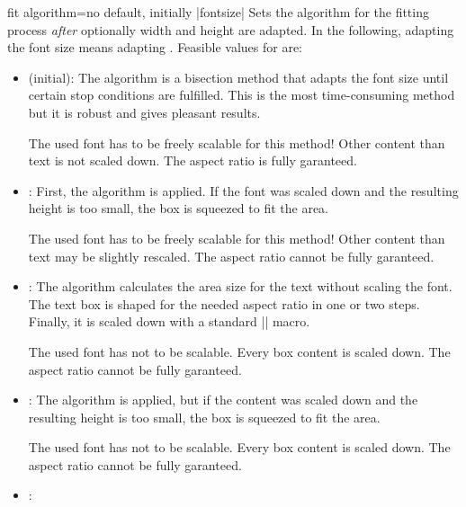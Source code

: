 \clearpage
\begin{docTcbKey}{fit algorithm}{=}{no default, initially |fontsize|}
Sets the algorithm for the fitting process \emph{after} optionally width and height
are adapted. In the following, adapting the font size means adapting
.
  Feasible values for  are:
  \begin{itemize}
  \item{} (initial):
    The algorithm is a bisection method that adapts the font size until
    certain stop conditions are fulfilled. This is the most time-consuming
    method but it is robust and gives pleasant results.
    \begin{marker}
    The used font has to be freely scalable for this method!
    Other content than text is not scaled down.
    The aspect ratio is fully garanteed.
    \end{marker}
  \item{}:
    First, the  algorithm is applied. If the font was scaled down
    and the resulting height is too small, the box is squeezed to fit the area.
    \begin{marker}
    The used font has to be freely scalable for this method!
    Other content than text may be slightly rescaled.
    The aspect ratio cannot be fully garanteed.
    \end{marker}
  \item{}:
    The algorithm calculates the area size for the text without scaling the font.
    The text box is shaped for the needed aspect ratio in one or two
    steps. Finally, it is scaled down with a standard |\resizebox| macro.
    \begin{marker}
    The used font has not to be scalable. Every box content is scaled down.
    The aspect ratio cannot be fully garanteed.
    \end{marker}
  \item{}:
    The  algorithm is applied, but if the content was scaled
    down and the resulting height is too small, the box is squeezed to fit the area.
    \begin{marker}
    The used font has not to be scalable. Every box content is scaled down.
    The aspect ratio cannot be fully garanteed.
    \end{marker}
  \item{}:

\end{itemize}
\end{docTcbKey}
